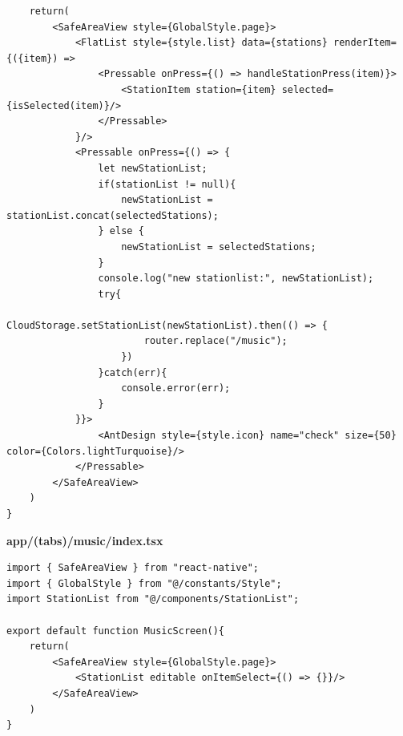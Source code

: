 \documentclass[11pt, twoside]{article}
\begin{document}
\begin{lstlisting}
    return(
        <SafeAreaView style={GlobalStyle.page}>
            <FlatList style={style.list} data={stations} renderItem={({item}) => 
                <Pressable onPress={() => handleStationPress(item)}>
                    <StationItem station={item} selected={isSelected(item)}/>
                </Pressable>
            }/>
            <Pressable onPress={() => {
                let newStationList;
                if(stationList != null){
                    newStationList = stationList.concat(selectedStations);
                } else {
                    newStationList = selectedStations;
                }
                console.log("new stationlist:", newStationList);
                try{
                    CloudStorage.setStationList(newStationList).then(() => {
                        router.replace("/music");
                    })
                }catch(err){
                    console.error(err);
                }
            }}>
                <AntDesign style={style.icon} name="check" size={50} color={Colors.lightTurquoise}/>
            </Pressable>
        </SafeAreaView>
    )
}
\end{lstlisting}

\textbf{app/(tabs)/music/index.tsx}
\begin{lstlisting}
import { SafeAreaView } from "react-native";
import { GlobalStyle } from "@/constants/Style";
import StationList from "@/components/StationList";

export default function MusicScreen(){
    return(
        <SafeAreaView style={GlobalStyle.page}>
            <StationList editable onItemSelect={() => {}}/>
        </SafeAreaView>
    )
}
\end{lstlisting}
\end{document}

